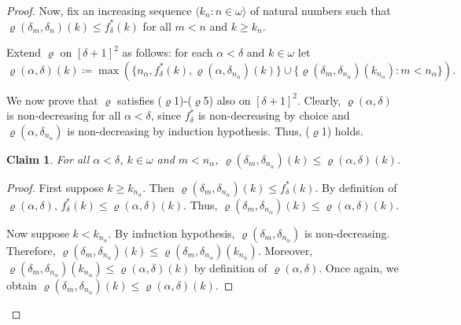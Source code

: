 \documentclass[]{amsart}
\newtheorem{claim}{Claim}[theorem]
\theoremstyle{definition}
\theoremstyle{remark}
\begin{document}
\begin{proof}
Now, fix an increasing sequence $\langle k_n : n \in \omega\rangle$ of natural numbers such that $\varrho(\delta_m, \delta_n)(k) \le f^*_\delta (k)$ for all $m < n$ and $k \ge k_n$.

Extend $\varrho$ on $[\delta+1]^2$ as follows: for each $\alpha < \delta$ and $k \in \omega$ let
\[
\varrho(\alpha, \delta)(k) \coloneqq \max (\{n_\alpha, f^*_\delta(k), \varrho(\alpha, \delta_{n_\alpha})(k)\} \cup \{\varrho(\delta_m, \delta_{n_\alpha})(k_{n_\alpha}) : m < n_\alpha\}).
\]

We now prove that $\varrho$ satisfies ($\varrho$1)-($\varrho$5) also on $[\delta+1]^2$. Clearly, $\varrho(\alpha, \delta)$ is non-decreasing for all $\alpha < \delta$, since $f^*_\delta$ is non-decreasing by choice and $\varrho(\alpha, \delta_{n_\alpha})$ is non-decreasing by induction hypothesis. Thus, ($\varrho$1) holds.

\begin{claim}\label{thm:dominating:claim4}
For all $\alpha < \delta$, $k \in \omega$ and $m < n_\alpha$, $\varrho(\delta_m, \delta_{n_\alpha})(k) \le \varrho(\alpha, \delta)(k)$.
\end{claim}
\begin{proof}
First suppose $k \ge k_{n_\alpha}$. Then $\varrho(\delta_{m}, \delta_{n_\alpha})(k) \le f^*_\delta (k)$. By definition of $\varrho(\alpha, \delta)$, $f^*_\delta(k) \le \varrho(\alpha, \delta)(k)$. Thus, $\varrho(\delta_{m}, \delta_{n_\alpha})(k) \le \varrho(\alpha, \delta)(k)$.

Now suppose $k < k_{n_\alpha}$. By induction hypothesis, $\varrho(\delta_m, \delta_{n_\alpha})$ is non-decreasing. Therefore, $\varrho(\delta_{m}, \delta_{n_\alpha})(k) \le \varrho(\delta_m, \delta_{n_\alpha})(k_{n_\alpha})$. Moreover, $\varrho(\delta_m, \delta_{n_\alpha})(k_{n_\alpha}) \le \varrho(\alpha, \delta)(k)$ by definition of $\varrho(\alpha, \delta)$. Once again, we obtain $\varrho(\delta_{m}, \delta_{n_\alpha})(k) \le \varrho(\alpha, \delta)(k)$.
\end{proof}


\end{proof}
\end{document}

